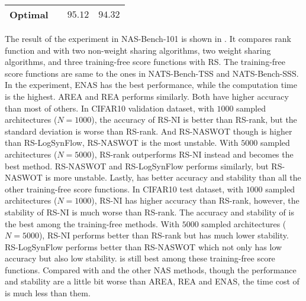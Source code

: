 \documentclass[sigconf]{acmart}
\begin{document}
\begin{table}[t]
{\begin{tabular}{@{}lrcc@{}}
            Optimal             &            & $95.12$          & $94.32$          \\ \bottomrule
            \end{tabular}
        }
        \label{table:overall_101}
        \vspace{-\baselineskip}
    \end{table}

    The result of the experiment in NAS-Bench-101 \cite{ying2019nasbench101} is shown in . 
    It compares rank function and \palg{} with two non-weight sharing algorithms, two weight 
    sharing algorithms, and three training-free score functions with RS. The training-free 
    score functions are same to the ones in NATS-Bench-TSS and NATS-Bench-SSS. In the experiment, ENAS has 
    the best performance, while the computation time is the highest. AREA and REA performs similarly. 
    Both have higher accuracy than most of others. 
    In CIFAR10 validation dataset, with $1000$ sampled architectures ($N=1000$), the accuracy of 
    RS-NI is better than RS-rank, but the standard deviation is worse than RS-rank. And RS-NASWOT 
    though is higher than RS-LogSynFlow, RS-NASWOT is the most unstable. With $5000$ sampled architectures 
    ($N=5000$), RS-rank outperforms RS-NI instead and becomes the best method. RS-NASWOT and RS-LogSynFlow
    performs similarly, but RS-NASWOT is more unstable. Lastly, \palg{} has better accuracy 
    and stability than all the other training-free score functions. In CIFAR10 test dataset, with $1000$ 
    sampled architectures ($N=1000$), RS-NI has higher accuracy than RS-rank, however, the stability of 
    RS-NI is much worse than RS-rank. The accuracy and stability of \palg{} is the best among the 
    training-free methods. With $5000$ sampled architectures ($N=5000$), RS-NI performs better than 
    RS-rank but has much lower stability. RS-LogSynFlow performs better than RS-NASWOT which not only 
    has low accuracy but also low stability. \palg{} is still best among these training-free score 
    functions. Compared with \palg{} and the other NAS methods, though the performance and stability 
    are a little bit worse than AREA, REA and ENAS, the time cost of \palg{} is much less than them. 
\end{document}
